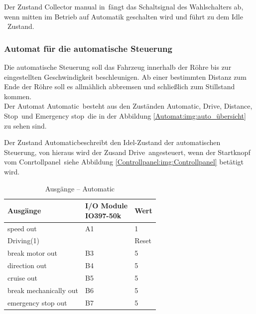 Der Zustand \frqq Collector manual in\flqq\ fängt  das Schaltsignal des Wahlschalters ab, wenn mitten im Betrieb auf Automatik geschalten wird und führt zu dem \frqq Idle \flqq\ Zustand.









\subsubsection{Automat für die automatische Steuerung}
\label{Automatensteuerung:Automat_auto}

Die automatische Steuerung soll das Fahrzeug innerhalb der Röhre bis zur eingestellten Geschwindigkeit beschleunigen. Ab einer bestimmten Distanz zum Ende der Röhre soll es allmählich abbremsen und schließlich zum Stillstand kommen.\\

Der Automat \frqq Automatic\flqq\ besteht aus den Zuständen \frqq Automatic\flqq, \frqq Drive\flqq, \frqq Distance\flqq, \frqq Stop\flqq\ und \frqq Emergency stop\flqq\ die in der Abbildung  \ref{Automat:img:auto_übersicht} zu sehen sind.

Der Zustand \frqq Automatic\flqq beschreibt den Idel-Zustand der automatischen Steuerung, von hieraus wird der Zusand \frqq Drive\flqq\ angesteuert, wenn der Startknopf vom \frqq Conrtollpanel\flqq\ siehe Abbildung \ref{Controllpanel:img:Controllpanel} betätigt wird.

\pagebreak[1]
\begin{table}[!ht]
	\centering
	\caption{Ausgänge – Automatic}
	\label{Automat_man:tab:automatic}
	\begin{tabular}{lll}
		\hline
		\textbf{Ausgänge}                           & \makecell{\textbf{I/O Module}         \\ \textbf{IO397-50k}}                 & \textbf{Wert} \\ \hline
		\multicolumn{1}{l|}{speed out}              & \multicolumn{1}{l|}{A1}       & 1     \\
		\multicolumn{1}{l|}{Driving(1)}             & \multicolumn{1}{l|}{}         & Reset \\
		\multicolumn{1}{l|}{break motor out}        & \multicolumn{1}{l|}{B3}       & 5     \\
		\multicolumn{1}{l|}{direction out}          & \multicolumn{1}{l|}{B4}       & 5     \\
		\multicolumn{1}{l|}{cruise out}             & \multicolumn{1}{l|}{B5}       & 5     \\
		\multicolumn{1}{l|}{break mechanically out} & \multicolumn{1}{l|}{B6}       & 5     \\
		\multicolumn{1}{l|}{emergency stop out}     & \multicolumn{1}{l|}{B7}       & 5     \\ \hline
	\end{tabular}
\end{table}
\pagebreak[2]

